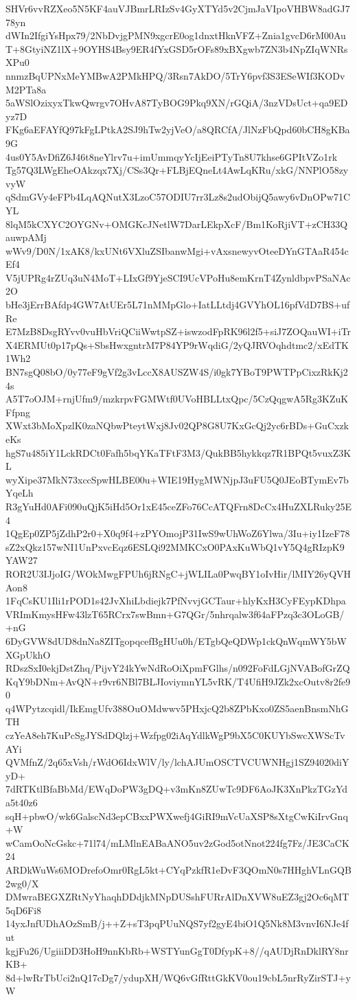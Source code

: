 SHVr6vvRZXeo5N5KF4auVJBmrLRIzSv4GyXTYd5v2CjmJaVIpoVHBW8adGJ778yn
dWIn2IfgiYsHpx79/2NbDvjgPMN9xgcrE0og1dnxtHknVFZ+Znia1gvcD6rM00Au
T+8GtyiNZ1lX+9OYHS4Bsy9ER4fYxGSD5rOFs89xBXgwb7ZN3b4NpZIqWNRsXPu0
nnmzBqUPNxMeYMBwA2PMkHPQ/3Rsn7AkDO/5TrY6pvf3S3ESeWIf3KODvM2PTa8a
5aWSlOzixyxTkwQwrgv7OHvA87TyBOG9Pkq9XN/rGQiA/3nzVDsUct+qa9EDyz7D
FKg6aEFAYfQ97kFgLPtkA2SJ9hTw2yjVeO/a8QRCfA/JlNzFbQpd60bCH8gKBa9G
4us0Y5AvDfiZ6J46t8neYlrv7u+imUmmqyYcIjEeiPTyTn8U7khse6GPItVZo1rk
Tg57Q3LWgEheOAkzqx7Xj/CSs3Qr+FLBjEQneLt4AwLqKRu/xkG/NNPlO58zyvyW
qSdmGVy4eFPb4LqAQNutX3LzoC57ODIU7rr3Lz8s2udObijQ5awy6vDnOPw71CYL
8lqM5kCXYC2OYGNv+OMGKcJNetlW7DarLEkpXcF/Bm1KoRjiVT+zCH33QauwpAMj
wWv9/D0N/1xAK8/kxUNt6VXluZSIbanwMgi+vAxsnewyvOteeDYnGTAaR454cEf4
V5jUPRg4rZUq3uN4MoT+LIxGf9YjeSCI9UcVPoHu8emKrnT4ZynldbpvPSaNAc2O
bHe3jErrBAfdp4GW7AtUEr5L71nMMpGlo+IatLLtdj4GVYhOL16pfVdD7BS+ufRe
E7MzB8DsgRYvv0vuHbVriQCiiWwtpSZ+iswzodFpRK96l2f5+siJ7ZOQauWI+iTr
X4ERMUt0p17pQs+SbsHwxgntrM7P84YP9rWqdiG/2yQJRVOqhdtmc2/xEdTK1Wh2
BN7sgQ08bO/0y77eF9gVf2g3vLccX8AUSZW4S/i0gk7YBoT9PWTPpCixzRkKj24s
A5T7oOJM+rnjUfm9/mzkrpvFGMWtf0UVoHBLLtxQpc/5CzQqgwA5Rg3KZuKFfpng
XWxt3bMoXpzlK0zaNQbwPteytWxj8Jv02QP8G8U7KxGcQj2yc6rBDs+GuCxzkeKs
hgS7u485iY1LckRDCt0Fafh5bqYKaTFtF3M3/QukBB5hykkqz7R1BPQt5vuxZ3KL
wyXipe37MkN73xccSpwHLBE00u+WIE19HygMWNjpJ3uFU5Q0JEoBTymEv7bYqeLh
R3gYuHd0AFi090uQjK5iHd5Or1xE45ceZFo76CcATQFrn8DcCx4HuZXLRuky25E4
1QgEp0ZP5jZdhP2r0+X0q9f4+zPYOmojP31IwS9wUhWoZ6Ylwa/3Iu+iy1IzeF78
sZ2xQkz157wNI1UnPxvcEqz6ESLQi92MMKCxO0PAxKuWbQ1vY5Q4gRIzpK9YAW27
ROR2U3IJjoIG/WOkMwgFPUh6jRNgC+jWLILa0PwqBY1oIvHir/lMIY26yQVHAon8
1FqCsKU1Ili1rPOD1s42JvXhiLbdiejk7PfNvvjGCTaur+hlyKxH3CyFEypKDhpa
VRImKmysHFw43lzT65RCrx7swBmn+G7QGr/5nhrqalw3f64aFPzq3c3OLoGB/+nG
6DyGVW8dUD8dnNa8ZITgopqcefBgHUu0h/ETgbQeQDWp1ckQnWqmWY5bWXGpUkhO
RDszSxI0ekjDstZhq/PijvY24kYwNdRoOiXpmFGlhs/n092FoFdLGjNVABofGrZQ
KqY9bDNm+AvQN+r9vr6NBl7BLJIoviymnYL5vRK/T4UfiH9JZk2xcOutv8r2fe90
q4WPytzcqidl/IkEmgUfv388OuOMdwwv5PHxjcQ2b8ZPbKxo0ZS5aenBnsmNhGTH
czYeA8eh7KuPcSgJYSdDQlzj+Wzfpg02iAqYdlkWgP9bX5C0KUYbSwcXWScTvAYi
QVMfnZ/2q65xVsh/rWdO6IdxWlV/ly/lchAJUmOSCTVCUWNHgj1SZ94020diYyD+
7dRTKtlBfaBbMd/EWqDoPW3gDQ+v3mKn8ZUwTc9DF6AoJK3XnPkzTGzYda5t40z6
sqH+pbwO/wk6GalscNd3epCBxxPWXwefj4GiRI9mVcUaXSP8sXtgCwKiIrvGnq+W
wCamOoNcGskc+71l74/mLMlnEABaANO5uv2zGod5otNnot224fg7Fz/JE3CaCK24
ARDkWuWs6MODrefoOmr0RgL5kt+CYqPzkfR1eDvF3QOmN0s7HHghVLnGQB2wg0/X
DMwraBEGXZRtNyYhaqhDDdjkMNpDUSshFURrAlDnXVW8uEZ3gj2Oc6qMT5qD6Fi8
14yxJnfUDhAOzSmB/j++Z+sT3pqPUuNQS7yf2gyE4biO1Q5Nk8M3vnvI6NJe4fut
kgjFu26/UgiiiDD3HoH9nnKbRb+WSTYunGgT0DfypK+8//qAUDjRnDklRY8nrKB+
8d+lwRrTbUci2nQ17cDg7/ydupXH/WQ6vGfRttGkKV0ou19cbL5nrRyZirSTJ+yW
